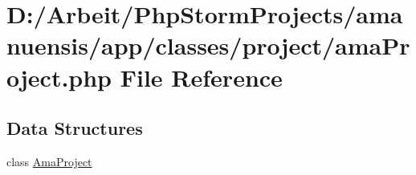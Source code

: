 \hypertarget{ama_project_8php}{}\section{D\+:/\+Arbeit/\+Php\+Storm\+Projects/amanuensis/app/classes/project/ama\+Project.php File Reference}
\label{ama_project_8php}
\subsection*{Data Structures}
\begin{DoxyCompactItemize}
\item 
class \hyperlink{class_ama_project}{Ama\+Project}
\end{DoxyCompactItemize}
